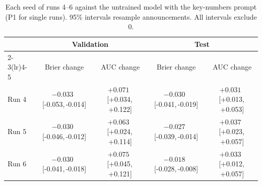 \documentclass[11pt]{article}
\newcommand{\ci}[2]{\,[#1,\,#2]}
\begin{document}
\begin{table}[H]
\centering\small
\caption{Each seed of runs 4--6 against the untrained model with the key-numbers prompt (P1 for single runs). 95\% intervals resample announcements. All intervals exclude 0.}
\label{tab:seedtest}
\setlength{\tabcolsep}{3.5pt}
\begin{tabular}{lcccc}
\toprule
 & \multicolumn{2}{c}{Validation} & \multicolumn{2}{c}{Test} \\
\cmidrule(lr){2-3}\cmidrule(lr){4-5}
 & Brier change & AUC change & Brier change & AUC change \\
\midrule
Run 4 & $-0.033$ \ci{-0.053}{-0.014} & $+0.071$ \ci{+0.034}{+0.122} & $-0.030$ \ci{-0.041}{-0.019} & $+0.031$ \ci{+0.013}{+0.053} \\
Run 5 & $-0.030$ \ci{-0.046}{-0.012} & $+0.063$ \ci{+0.024}{+0.114} & $-0.027$ \ci{-0.039}{-0.014} & $+0.037$ \ci{+0.023}{+0.057} \\
Run 6 & $-0.030$ \ci{-0.041}{-0.018} & $+0.075$ \ci{+0.045}{+0.121} & $-0.018$ \ci{-0.028}{-0.008} & $+0.033$ \ci{+0.012}{+0.057} \\
\bottomrule
\end{tabular}
\end{table}
\end{document}

